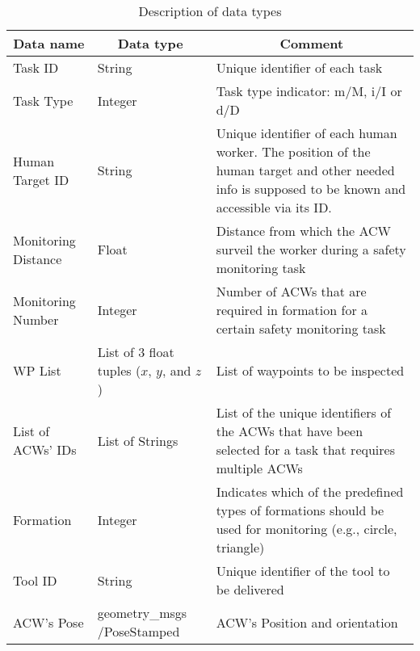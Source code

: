 \begin{table}[htb]
    \centering
    \caption{Description of data types}
    \label{tab:shareddata}
    \small
    \begin{tabular}{|p{}|p{}|p{}|}
      \hline
      \multicolumn{1}{|c}{\textbf{Data name}} & \multicolumn{1}{|c|}{\textbf{Data type}} & \multicolumn{1}{c|}{\textbf{Comment}} \\ \hline \hline
      
      Task ID & String & Unique identifier of each task \\ \hline
      
      Task Type & Integer & Task type indicator: m/M, i/I or d/D \\ \hline
      
      Human Target ID & String & Unique identifier of each human worker. The position of the human target and other needed info is supposed to be known and accessible via its ID. \\ \hline
      
      Monitoring Distance & Float & Distance from which the \gls{ACW} surveil the worker during a safety monitoring task \\ \hline
      
      Monitoring Number & Integer & Number of \glspl{ACW} that are required in formation for a certain safety monitoring task \\ \hline
      
      WP List & List of $3$ float tuples ($x$, $y$, and $z$) & List of waypoints to be inspected \\ \hline
      
      List of \glspl{ACW}' IDs & List of Strings & List of the unique identifiers of the \glspl{ACW} that have been selected for a task that requires multiple \glspl{ACW} \\ \hline
      
      Formation & Integer & Indicates which of the predefined types of formations should be used for monitoring (e.g., circle, triangle) \\ \hline
      
      Tool ID & String & Unique identifier of the tool to be delivered \\ \hline
      
      \gls{ACW}'s Pose & geometry\_msgs /PoseStamped & \gls{ACW}'s Position and orientation \\ \hline
      

\end{tabular}
\end{table}

